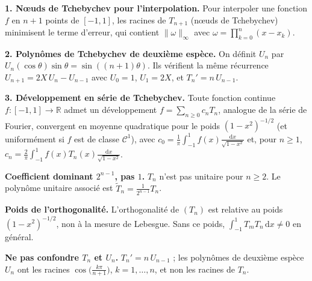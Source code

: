 \begin{mdframed}[style=exbar]
  \textbf{1. Nœuds de Tchebychev pour l'interpolation.}\enspace%
  Pour interpoler une fonction $f$ en $n+1$ points de $[-1,1]$, les racines
  de $T_{n+1}$ (nœuds de Tchebychev) minimisent le terme d'erreur, qui
  contient $\|\omega\|_\infty$ avec $\omega=\prod_{k=0}^{n}(x-x_k)$.

  \smallskip\noindent
  \textbf{2. Polynômes de Tchebychev de deuxième espèce.}\enspace%
  On définit $U_n$ par $U_n(\cos\theta)\sin\theta = \sin((n+1)\theta)$.
  Ils vérifient la même récurrence $U_{n+1}=2X\,U_n - U_{n-1}$ avec
  $U_0=1$, $U_1=2X$, et $T_n' = n\,U_{n-1}$.

  \smallskip\noindent
  \textbf{3. Développement en série de Tchebychev.}\enspace
  Toute fonction continue $f:[-1,1]\to\mathbb{R}$ admet un développement
  $f = \sum_{n\geq 0} c_n T_n$, analogue de la série de Fourier, convergent
  en moyenne quadratique pour le poids ${(1-x^2)}^{-1/2}$ (et uniformément
  si $f$ est de classe $\mathcal{C}^1$), avec
  $c_0 = \frac{1}{\pi}\int_{-1}^1 f(x)\frac{\mathrm{d}x}{\sqrt{1-x^2}}$
  et, pour $n\geq 1$,
  $c_n = \frac{2}{\pi}\int_{-1}^1 f(x)T_n(x)\frac{\mathrm{d}x}{\sqrt{1-x^2}}$.
\end{mdframed}

\vspace{6pt}

\begin{mdframed}[style=cexbar]
  \textbf{Coefficient dominant $2^{n-1}$, pas $1$.}\enspace
  $T_n$ n'est pas unitaire pour $n\geq 2$. Le polynôme unitaire associé est
  $\widetilde{T}_n = \frac{1}{2^{n-1}}T_n$.

  \smallskip\noindent
  \textbf{Poids de l'orthogonalité.}\enspace
  L'orthogonalité de $(T_n)$ est relative au poids
  ${(1-x^2)}^{-1/2}$, non à la mesure de Lebesgue. Sans ce poids,
  $\int_{-1}^1 T_m T_n\,\mathrm{d}x \neq 0$ en général.

  \smallskip\noindent
  \textbf{Ne pas confondre $T_n$ et $U_n$.}\enspace
  $T_n' = n\,U_{n-1}$ ; les polynômes de deuxième espèce $U_n$ ont les
  racines $\cos\!\bigl(\frac{k\pi}{n+1}\bigr)$, $k=1,\ldots,n$, et non
  les racines de $T_n$.
\end{mdframed}

\vspace{6pt}
\exolabel

